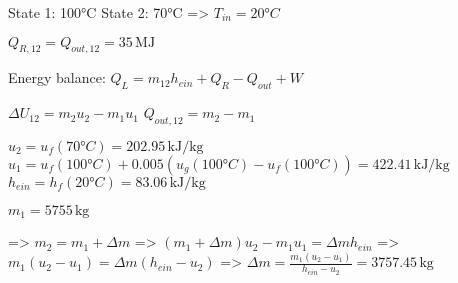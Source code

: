 State 1: 100°C  
State 2: 70°C  
=> \( T_{in} = 20°C \)  

\( Q_{R,12} = Q_{out,12} = 35 \, \text{MJ} \)  

Energy balance:  
\( Q_{L} = m_{12} h_{ein} + Q_{R} - Q_{out} + W \)  

\( \Delta U_{12} = m_{2} u_{2} - m_{1} u_{1} \)  
\( Q_{out,12} = m_{2} - m_{1} \)  

\( u_{2} = u_{f}(70°C) = 202.95 \, \text{kJ/kg} \)  
\( u_{1} = u_{f}(100°C) + 0.005 (u_{g}(100°C) - u_{f}(100°C)) = 422.41 \, \text{kJ/kg} \)  
\( h_{ein} = h_{f}(20°C) = 83.06 \, \text{kJ/kg} \)  

\( m_{1} = 5755 \, \text{kg} \)  

=> \( m_{2} = m_{1} + \Delta m \)  
=> \( (m_{1} + \Delta m) u_{2} - m_{1} u_{1} = \Delta m h_{ein} \)  
=> \( m_{1} (u_{2} - u_{1}) = \Delta m (h_{ein} - u_{2}) \)  
=> \( \Delta m = \frac{m_{1} (u_{2} - u_{1})}{h_{ein} - u_{2}} = 3757.45 \, \text{kg} \)